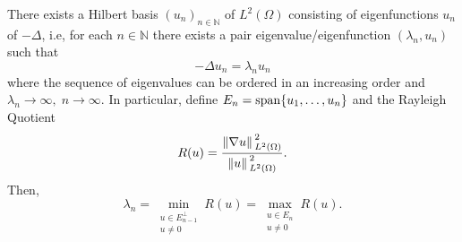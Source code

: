 \begin{theorem}\label{spec_lap_pre}
    There exists a Hilbert basis \((u_n)_{n \in \mathbb{N}}\) of \(L^2(\Omega)\) consisting of eigenfunctions \(u_n\) of \(-\Delta\), i.e, for each \(n \in \mathbb{N}\) there exists a pair eigenvalue/eigenfunction \((\lambda_n, u_n)\) such that
    \[
        -\Delta u_n = \lambda_n u_n
    \]
    where the sequence of eigenvalues can be ordered in an increasing order and \(\lambda_n \rightarrow \infty, \; n \rightarrow \infty\). In particular, define \(E_n = \operatorname{span}\{u_1, \dots, u_n\}\) and the Rayleigh Quotient
    \[
        R(u) = \frac{\norm*{\nabla u}^2_{L^2(\Omega)}}{\norm*{u}^2_{L^2(\Omega)}}.
    \]
    Then,
    \[
    \lambda_n = \min_{\substack{u \in E^\perp_{n-1} \\ u \neq 0}} R(u) = \max_{\substack{u \in E_n \\ u \neq 0}} R(u).
    \]
\end{theorem}
